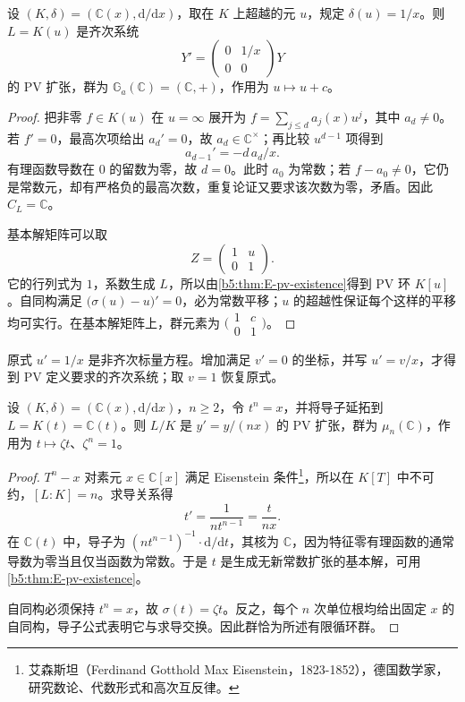 \begin{example}[对数型扩张]\label{b5:exm:E-logarithm}
	设 \((K,\delta)=(\mathbb C(x),\mathrm d/\mathrm dx)\)，取在 \(K\) 上超越的元 \(u\)，规定 \(\delta(u)=1/x\)。则 \(L=K(u)\) 是齐次系统
	\[
		Y'=\begin{pmatrix}0&1/x\\0&0\end{pmatrix}Y
	\]
	的 PV 扩张，群为 \(\mathbb G_a(\mathbb C)=(\mathbb C,+)\)，作用为 \(u\mapsto u+c\)。
\end{example}
\begin{proof}
	把非零 \(f\in K(u)\) 在 \(u=\infty\) 展开为 \(f=\sum_{j\le d}a_j(x)u^j\)，其中 \(a_d\ne0\)。若 \(f'=0\)，最高次项给出 \(a_d'=0\)，故 \(a_d\in\mathbb C^\times\)；再比较 \(u^{d-1}\) 项得到
	\[
		a_{d-1}'=-d\,a_d/x.
	\]
	有理函数导数在 \(0\) 的留数为零，故 \(d=0\)。此时 \(a_0\) 为常数；若 \(f-a_0\ne0\)，它仍是常数元，却有严格负的最高次数，重复论证又要求该次数为零，矛盾。因此 \(C_L=\mathbb C\)。

	基本解矩阵可以取
	\[
		Z=\begin{pmatrix}1&u\\0&1\end{pmatrix}.
	\]
	它的行列式为 \(1\)，系数生成 \(L\)，所以由\cref{b5:thm:E-pv-existence}得到 PV 环 \(K[u]\)。自同构满足 \(\bigl(\sigma(u)-u\bigr)'=0\)，必为常数平移；\(u\) 的超越性保证每个这样的平移均可实行。在基本解矩阵上，群元素为 \(\bigl(\begin{smallmatrix}1&c\\0&1\end{smallmatrix}\bigr)\)。
\end{proof}

原式 \(u'=1/x\) 是非齐次标量方程。增加满足 \(v'=0\) 的坐标，并写 \(u'=v/x\)，才得到 PV 定义要求的齐次系统；取 \(v=1\) 恢复原式。

\begin{example}[根式型扩张]\label{b5:exm:E-radical}
	设 \((K,\delta)=(\mathbb C(x),\mathrm d/\mathrm dx)\)，\(n\ge2\)，令 \(t^n=x\)，并将导子延拓到 \(L=K(t)=\mathbb C(t)\)。则 \(L/K\) 是 \(y'=y/(nx)\) 的 PV 扩张，群为 \(\mu_n(\mathbb C)\)，作用为 \(t\mapsto\zeta t\)、\(\zeta^n=1\)。
\end{example}
\begin{proof}
	\(T^n-x\) 对素元 \(x\in\mathbb C[x]\) 满足 Eisenstein 条件\footnote{艾森斯坦（Ferdinand Gotthold Max Eisenstein，1823-1852），德国数学家，研究数论、代数形式和高次互反律。}，所以在 \(K[T]\) 中不可约，\([L:K]=n\)。求导关系得
	\[
		t'=\frac{1}{nt^{n-1}}=\frac{t}{nx}.
	\]
	在 \(\mathbb C(t)\) 中，导子为 \((nt^{n-1})^{-1}\cdot\mathrm{d}/\mathrm{d}t\)，其核为 \(\mathbb C\)，因为特征零有理函数的通常导数为零当且仅当函数为常数。于是 \(t\) 是生成无新常数扩张的基本解，可用\cref{b5:thm:E-pv-existence}。

	自同构必须保持 \(t^n=x\)，故 \(\sigma(t)=\zeta t\)。反之，每个 \(n\) 次单位根均给出固定 \(x\) 的自同构，导子公式表明它与求导交换。因此群恰为所述有限循环群。
\end{proof}

